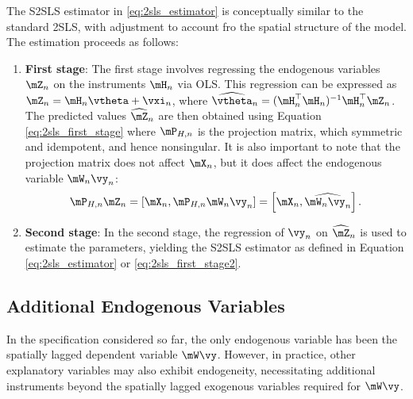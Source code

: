 \documentclass[english,12pt]{book}\usepackage[]{graphicx}\usepackage[]{xcolor}
\begin{document}
The S2SLS estimator in \eqref{eq:2sls_estimator} is conceptually similar to the standard 2SLS, with adjustment to account fro the spatial structure of the model. The estimation proceeds as follows:
\begin{enumerate}
  \item \textbf{First stage}: The first stage involves regressing the endogenous variables $\mZ_n$ on the instruments $\mH_n$ via OLS. This regression can be expressed as $\mZ_n = \mH_n\vtheta + \vxi_n$, where $\widehat{\vtheta}_n = (\mH^\top_n\mH_n)^{-1}\mH^\top_n\mZ_n$. The predicted values $\widehat{\mZ}_n$ are then obtained using Equation \eqref{eq:2sls_first_stage} where $\mP_{H,n}$ is the projection matrix, which symmetric and idempotent, and hence nonsingular. It is also important to note that the projection matrix does not affect $\mX_n$, but it does affect the endogenous variable $\mW_n\vy_n$:
\begin{equation}
  \mP_{H, n}\mZ_n = \left[\mX_n, \mP_{H, n}\mW_n\vy_n\right] = \left[\mX_n, \widehat{\mW_n\vy_n}\right].
\end{equation}

\item \textbf{Second stage}: In the second stage, the regression of $\vy_n$ on $\widehat{\mZ}_n$ is used to estimate the parameters, yielding the S2SLS estimator as defined in Equation \eqref{eq:2sls_estimator} or \eqref{eq:2sls_first_stage2}.
\end{enumerate}

\subsection{Additional Endogenous Variables}

In the specification considered so far, the only endogenous variable has been the spatially lagged dependent variable $\mW\vy$. However, in practice, other explanatory variables may also exhibit endogeneity, necessitating additional instruments beyond the spatially lagged exogenous variables required for $\mW\vy$.
\end{document}
